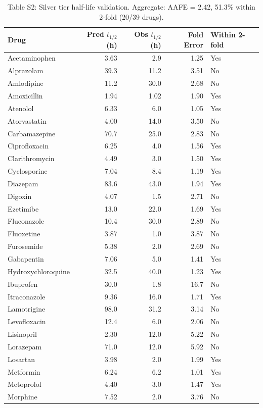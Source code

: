 \documentclass[review,3p]{elsarticle}
\begin{document}
\begin{table}[H]
\centering
\caption*{Table S2: Silver tier half-life validation. Aggregate: AAFE = 2.42, 51.3\% within 2-fold (20/39 drugs).}
\small
\begin{tabular}{lrrrl}
\toprule
Drug & Pred $t_{1/2}$ (h) & Obs $t_{1/2}$ (h) & Fold Error & Within 2-fold \\
\midrule
Acetaminophen & 3.63 & 2.9 & 1.25 & Yes \\
Alprazolam & 39.3 & 11.2 & 3.51 & No \\
Amlodipine & 11.2 & 30.0 & 2.68 & No \\
Amoxicillin & 1.94 & 1.02 & 1.90 & Yes \\
Atenolol & 6.33 & 6.0 & 1.05 & Yes \\
Atorvastatin & 4.00 & 14.0 & 3.50 & No \\
Carbamazepine & 70.7 & 25.0 & 2.83 & No \\
Ciprofloxacin & 6.25 & 4.0 & 1.56 & Yes \\
Clarithromycin & 4.49 & 3.0 & 1.50 & Yes \\
Cyclosporine & 7.04 & 8.4 & 1.19 & Yes \\
Diazepam & 83.6 & 43.0 & 1.94 & Yes \\
Digoxin & 4.07 & 1.5 & 2.71 & No \\
Ezetimibe & 13.0 & 22.0 & 1.69 & Yes \\
Fluconazole & 10.4 & 30.0 & 2.89 & No \\
Fluoxetine & 3.87 & 1.0 & 3.87 & No \\
Furosemide & 5.38 & 2.0 & 2.69 & No \\
Gabapentin & 7.06 & 5.0 & 1.41 & Yes \\
Hydroxychloroquine & 32.5 & 40.0 & 1.23 & Yes \\
Ibuprofen & 30.0 & 1.8 & 16.7 & No \\
Itraconazole & 9.36 & 16.0 & 1.71 & Yes \\
Lamotrigine & 98.0 & 31.2 & 3.14 & No \\
Levofloxacin & 12.4 & 6.0 & 2.06 & No \\
Lisinopril & 2.30 & 12.0 & 5.22 & No \\
Lorazepam & 71.0 & 12.0 & 5.92 & No \\
Losartan & 3.98 & 2.0 & 1.99 & Yes \\
Metformin & 6.24 & 6.2 & 1.01 & Yes \\
Metoprolol & 4.40 & 3.0 & 1.47 & Yes \\
Morphine & 7.52 & 2.0 & 3.76 & No \\

\end{tabular}
\end{table}
\end{document}
